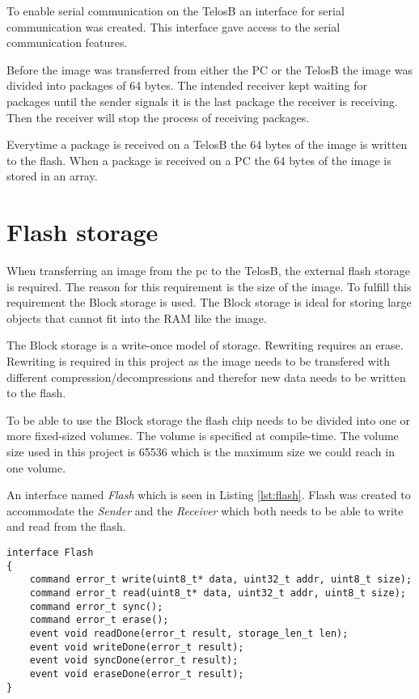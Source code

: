 To enable serial communication on the TelosB an interface for serial communication was created. This interface gave access to the serial communication features. 

Before the image was transferred from either the PC or the TelosB the image was divided into packages of 64 bytes. The intended receiver kept waiting for packages until the sender signals it is the last package the receiver is receiving. Then the receiver will stop the process of receiving packages. 

Everytime a package is received on a TelosB the 64 bytes of the image is written to the flash. When a package is received on a PC the 64 bytes of the image is stored in an array. 


\section{Flash storage}

When transferring an image from the pc to the TelosB, the external flash storage is required. The reason for this requirement is the size of the image. To fulfill this requirement the Block storage is used. The Block storage is ideal for storing large objects that cannot fit into the RAM like the image.

The Block storage is a write-once model of storage. Rewriting requires an erase. Rewriting is required in this project as the image needs to be transfered with different compression/decompressions and therefor new data needs to be written to the flash.

To be able to use the Block storage the flash chip needs to be divided into one or more fixed-sized volumes. The volume is specified at compile-time. The volume size used in this project is 65536 which is the maximum size we could reach in one volume.

An interface named \emph{Flash} which is seen in Listing \ref{lst:flash}. Flash was created to accommodate the \emph{Sender} and the \emph{Receiver} which both needs to be able to write and read from the flash. 

\begin{lstlisting}[caption={The interface flash}, label=lst:flash]
interface Flash
{
	command error_t write(uint8_t* data, uint32_t addr, uint8_t size);
	command error_t read(uint8_t* data, uint32_t addr, uint8_t size);
	command error_t sync();
	command error_t erase();
	event void readDone(error_t result, storage_len_t len);
	event void writeDone(error_t result);
	event void syncDone(error_t result);
	event void eraseDone(error_t result);	
}
\end{lstlisting}

